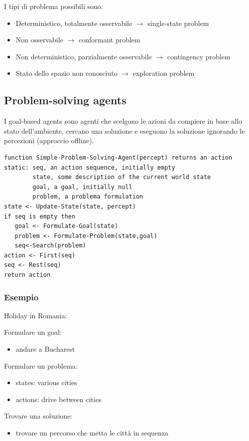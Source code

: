 \documentclass[12pt, a4paper]{article}
\begin{document}
I tipi di problema possibili sono:
\begin{itemize}
  \item Deterministico, totalmente osservabile $\to$ single-state problem
  \item Non osservabile $\to$ conformant problem
  \item Non deterministico, parzialmente osservabile $\to$ contingency problem
  \item Stato dello spazio non conosciuto $\to$ exploration problem
\end{itemize}

\subsection{Problem-solving agents}

I goal-based agents sono agenti che scelgono le azioni da compiere in base allo stato dell'ambiente, cercano una soluzione e eseguono la soluzione ignorando le percezioni (approccio offline).

\begin{lstlisting}
function Simple-Problem-Solving-Agent(percept) returns an action
static: seq, an action sequence, initially empty
        state, some description of the current world state
        goal, a goal, initially null
        problem, a problema formulation
state <- Update-State(state, percept)
if seq is empty then
   goal <- Formulate-Goal(state)
   problem <- Formulate-Problem(state,goal)
   seq<-Search(problem)
action <- First(seq)
seq <- Rest(seq)
return action
\end{lstlisting}

\subsubsection*{Esempio}

Holiday in Romania:

Formulare un goal:
\begin{itemize}
  \item andare a Bucharest
\end{itemize}
Formulare un problema: 
\begin{itemize}
  \item states: various cities
  \item actions: drive between cities
\end{itemize}
Trovare una soluzione:
\begin{itemize}
  \item trovare un percorso che metta le città in sequenza
\end{itemize}
\end{document}
